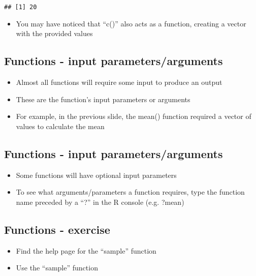\documentclass[]{article}
\providecommand{\tightlist}{%
  \setlength{\itemsep}{0pt}\setlength{\parskip}{0pt}}
\begin{document}
\begin{verbatim}
## [1] 20
\end{verbatim}

\begin{itemize}
\tightlist
\item
  You may have noticed that ``c()'' also acts as a function, creating a
  vector with the provided values
\end{itemize}

\subsection{Functions - input
parameters/arguments}\label{functions---input-parametersarguments}

\begin{itemize}
\tightlist
\item
  Almost all functions will require some input to produce an output
\item
  These are the function's input parameters or arguments
\item
  For example, in the previous slide, the mean() function required a
  vector of values to calculate the mean
\end{itemize}

\subsection{Functions - input
parameters/arguments}\label{functions---input-parametersarguments-1}

\begin{itemize}
\tightlist
\item
  Some functions will have optional input parameters
\item
  To see what arguments/parameters a function requires, type the
  function name preceded by a ``?'' in the R console (e.g. ?mean)
\end{itemize}

\subsection{Functions - exercise}\label{functions---exercise}

\begin{itemize}
\tightlist
\item
  Find the help page for the ``sample'' function
\item
  Use the ``sample'' function
\end{itemize}
\end{document}
